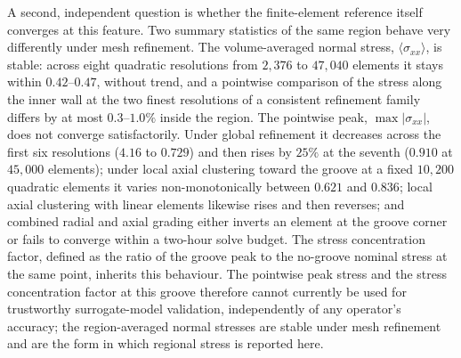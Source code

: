 \documentclass[final,5p,times]{elsarticle}
\begin{document}
A second, independent question is whether the finite-element reference
itself converges at this feature. Two summary statistics of the same
region behave very differently under mesh refinement. The volume-averaged
normal stress, $\langle\sigma_{xx}\rangle$, is stable: across eight quadratic
resolutions from $2{,}376$ to $47{,}040$ elements it stays within
$0.42$--$0.47$, without trend, and a pointwise comparison of the stress
along the inner wall at the two finest resolutions of a consistent
refinement family differs by at most $0.3$--$1.0\%$ inside the region.
The pointwise peak, $\max|\sigma_{xx}|$, does not converge
satisfactorily. Under global refinement it decreases across the first six resolutions
($4.16$ to $0.729$) and then rises by $25\%$ at the seventh
($0.910$ at $45{,}000$ elements); under local axial clustering toward
the groove at a fixed $10{,}200$ quadratic elements it varies
non-monotonically between $0.621$ and $0.836$; local axial clustering
with linear elements likewise rises and then reverses; and combined
radial and axial grading either inverts an element at the groove corner
or fails to converge within a two-hour solve budget. The stress
concentration factor, defined as the ratio of the groove peak to the
no-groove nominal stress at the same point, inherits this behaviour.
The pointwise peak stress and the stress concentration factor at this
groove therefore cannot currently be used for trustworthy surrogate-model
validation, independently of any operator's accuracy; the
region-averaged normal stresses are stable under mesh refinement and are
the form in which regional stress is reported here.
\end{document}
